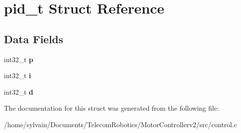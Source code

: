 \hypertarget{structpid__t}{}\section{pid\+\_\+t Struct Reference}
\label{structpid__t}
\subsection*{Data Fields}
\begin{DoxyCompactItemize}
\item 
\hypertarget{structpid__t_af6596d65084199a993e6f90e5f7675ac}{}\label{structpid__t_af6596d65084199a993e6f90e5f7675ac} 
int32\+\_\+t {\bfseries p}
\item 
\hypertarget{structpid__t_a89f5171f7a3a239878dc1040c18c8c21}{}\label{structpid__t_a89f5171f7a3a239878dc1040c18c8c21} 
int32\+\_\+t {\bfseries i}
\item 
\hypertarget{structpid__t_a351b8a869f430601a7b2e1e22adf285a}{}\label{structpid__t_a351b8a869f430601a7b2e1e22adf285a} 
int32\+\_\+t {\bfseries d}
\end{DoxyCompactItemize}


The documentation for this struct was generated from the following file\+:\begin{DoxyCompactItemize}
\item 
/home/sylvain/\+Documents/\+Telecom\+Robotics/\+Motor\+Controllerv2/src/control.\+c\end{DoxyCompactItemize}

